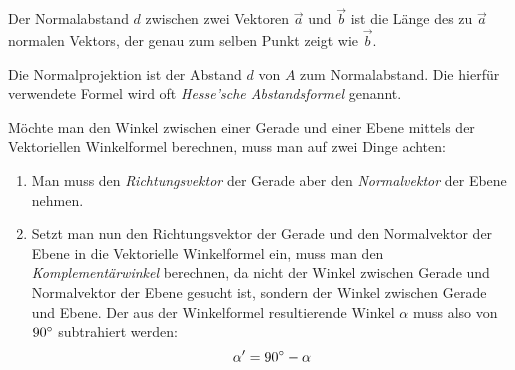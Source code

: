 Der Normalabstand $d$ zwischen zwei Vektoren $\vec{a}$ und $\vec{b}$ ist die L\"{a}nge des zu $\vec{a}$ normalen Vektors, der genau zum selben Punkt zeigt wie $\vec{b}$.

\begin{figure}[h!]
  \centering
\end{figure}


Die Normalprojektion ist der Abstand $d$ von $A$ zum Normalabstand. Die hierf\"{u}r verwendete Formel wird oft \emph{Hesse'sche Abstandsformel} genannt.

\begin{figure}[h!]
  \centering
\end{figure}


M\"{o}chte man den Winkel zwischen einer Gerade und einer Ebene mittels der Vektoriellen Winkelformel berechnen, muss man auf zwei Dinge achten:

\begin{enumerate}
  \item Man muss den \emph{Richtungsvektor} der Gerade aber den \emph{Normalvektor} der Ebene nehmen.

  \item Setzt man nun den Richtungsvektor der Gerade und den Normalvektor der Ebene in die Vektorielle Winkelformel ein, muss man den \emph{Komplement\"{a}rwinkel} berechnen, da nicht der Winkel zwischen Gerade und Normalvektor der Ebene gesucht ist, sondern der Winkel zwischen Gerade und Ebene. Der aus der Winkelformel resultierende Winkel $\alpha$ muss also von $90\degree$ subtrahiert werden: $$\alpha' = 90\degree - \alpha$$
\end{enumerate}


